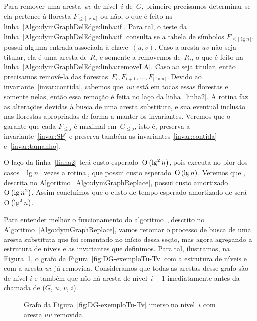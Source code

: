 Para remover uma aresta~$uv$ de nível~$i$ de~$G$, primeiro precisamos determinar se ela pertence à floresta $F_{\leqslant\lceil \lg n \rceil}$ ou não, o que é feito na linha~\ref{Algo:dymGraphDelEdge:linha:if}. Para tal, o teste da linha~\ref{Algo:dymGraphDelEdge:linha:if} consulta se a tabela de símbolos $F_{\leqslant\lceil \lg n \rceil}$.\dymForestHash{} possui alguma entrada associada à chave~$(u,v)$. Caso a aresta $uv$ não seja titular, 
ela é uma aresta de~$R_i$ e somente a removemos de~$R_i$, o que é feito na linha~\ref{Algo:dymGraphDelEdge:linha:removeLA}.
Caso $uv$ seja titular, então precisamos removê-la das florestas~$F_i, F_{i+1}, \ldots, F_{\lceil \lg n \rceil}$.  Devido ao invariante~\ref{invar:contida}, sabemos que~$uv$ está em todas essas florestas e somente nelas, então essa remoção é feita no laço da linha~\ref{linha2}.  
A rotina \dymGraphReplace{} faz as alterações devidas à busca de uma aresta substituta, e sua eventual inclusão nas florestas apropriadas de forma a manter os invariantes.
Veremos que o \dymGraphReplace{} garante que cada $F_{\leqslant j}$ é maximal em~$G_{\leqslant j}$, isto é, preserva a invariante~\ref{invar:SF} e preserva também as invariantes~\ref{invar:contida} e~\ref{invar:tamanho}.

O laço da linha~\ref{linha2} terá custo esperado~$\text{O}\left(\lg^2 n\right)$, pois executa no pior dos casos $\lceil \lg n \rceil$ vezes a rotina \dymForestDelEdge{}, que possui custo esperado~$\text{O}\left(\lg n\right)$. Veremos que \dymGraphReplace{}, descrita no Algoritmo~\ref{Algo:dymGraphReplace}, possui custo amortizado~$\text{O}\left(\lg n^2\right)$. Assim concluímos que o custo de tempo esperado amortizado de \dymGraphDelEdge{} será~$\text{O}\left(\lg^2 n\right)$.

\medskip

Para entender melhor o funcionamento do algoritmo~\dymGraphReplace{}, descrito no Algoritmo~\ref{Algo:dymGraphReplace}, vamos retomar o processo de busca de uma aresta substituta que foi comentado no início dessa seção, mas agora agregando a estrutura de níveis e as invariantes que definimos. Para tal, ilustramos, na Figura~\ref{fig:DG-antes-de-rebaixar}, o grafo da Figura~\ref{fig:DG-exemploTu-Tv} com a estrutura de níveis e com a aresta $uv$ já removida. Consideramos que todas as arestas desse grafo são de nível $i$ e também que não há aresta de nível~$i-1$ imediatamente antes da chamada de \dymGraphReplace($G$, $u$, $v$, $i$).
\begin{figure}[htb]
\centering
\caption{Grafo da Figura~\ref{fig:DG-exemploTu-Tv} imerso no nível~$i$ com aresta $uv$ removida.}
\label{fig:DG-antes-de-rebaixar}
\end{figure}

